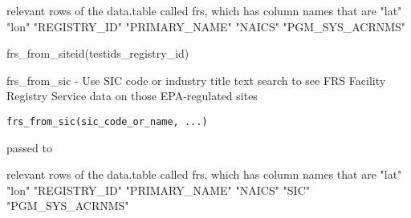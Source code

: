 \documentclass[a4paper]{book}
\begin{document}
%
\begin{Value}
relevant rows of the data.table called frs, which has column names that are
"lat" "lon" "REGISTRY\_ID" "PRIMARY\_NAME" "NAICS" "PGM\_SYS\_ACRNMS"
\end{Value}
%
\begin{Examples}
\begin{ExampleCode}
frs_from_siteid(testids_registry_id)
\end{ExampleCode}
\end{Examples}
%
\begin{Description}\relax
frs\_from\_sic - Use SIC code or industry title text search to see FRS Facility Registry Service data on those EPA-regulated sites
\end{Description}
%
\begin{Usage}
\begin{verbatim}
frs_from_sic(sic_code_or_name, ...)
\end{verbatim}
\end{Usage}
%
\begin{Arguments}
\begin{ldescription}
\item[\code{...}] passed to 

\item[\code{naics\_code\_or\_name}] 
\end{ldescription}
\end{Arguments}
%
\begin{Value}
relevant rows of the data.table called frs, which has column names that are
"lat" "lon" "REGISTRY\_ID" "PRIMARY\_NAME" "NAICS" "SIC" "PGM\_SYS\_ACRNMS"
\end{Value}
%
\begin{SeeAlso}\relax
{} 
\end{SeeAlso}
%
\begin{Examples}
\end{Examples}
\end{document}
